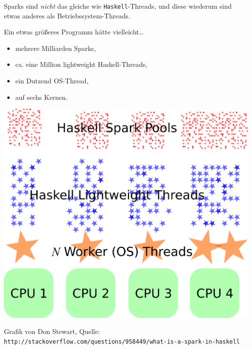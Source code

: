 \documentclass{beamer}
\begin{document}
\begin{frame}

\begin{multicols}{2}

Sparks sind \emph{nicht} das gleiche wie \texttt{Haskell}-Threads, und diese wiederum sind etwas anderes als Betriebssystem-Threads.

Ein etwas größeres Programm hätte vielleicht\dots\pause

\begin{itemize}
\item mehrere Milliarden Sparks,\pause
\item ca. eine Million lightweight Haskell-Threads,\pause
\item ein Dutzend OS-Thread,\pause
\item auf sechs Kernen.\pause
\end{itemize}

\columnbreak

\includegraphics[scale=0.25]{sparks.png}
\end{multicols}

\footnotesize
Grafik von Don Stewart, Quelle:
\texttt{http://stackoverflow.com/questions/958449/what-is-a-spark-in-haskell}
\normalsize
\end{frame}

\end{document}
